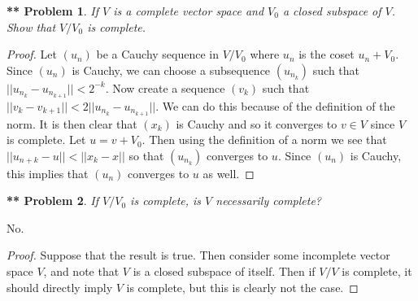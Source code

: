 \documentclass{article}
\newtheorem{**}{** Problem}
\begin{document}
\begin{flushleft}
\begin{**}
If $V$ is a complete vector space and $V_0$ a closed subspace of $V$. Show that $V / V_0$ is complete.
\end{**}
\begin{proof}
Let $(u_n)$ be a Cauchy sequence in $V / V_0$ where $u_n$ is the coset $u_n + V_0$. Since $(u_n)$ is Cauchy, we can choose a subsequence $(u_{n_k})$ such that $||u_{n_k} - u_{n_{k+1}}|| < 2^{-k}$. Now create a sequence $(v_k)$ such that $||v_k - v_{k+1}|| < 2||u_{n_k} - u_{n_{k+1}}||$. We can do this because of the definition of the norm. It is then clear that $(x_k)$ is Cauchy and so it converges to $v \in V$ since $V$ is complete. Let $u = v + V_0$. Then using the definition of a norm we see that $||u_{n+k} - u|| < ||x_k - x||$ so that $(u_{n_k})$ converges to $u$. Since $(u_n)$ is Cauchy, this implies that $(u_n)$ converges to $u$ as well.
\end{proof}

\begin{**}
If $V / V_0$ is complete, is $V$ necessarily complete?
\end{**}

No.
\begin{proof}
Suppose that the result is true. Then consider some incomplete vector space $V$, and note that $V$ is a closed subspace of itself. Then if $V / V$ is complete, it should directly imply $V$ is complete, but this is clearly not the case.
\end{proof}

\end{flushleft}
\end{document}
